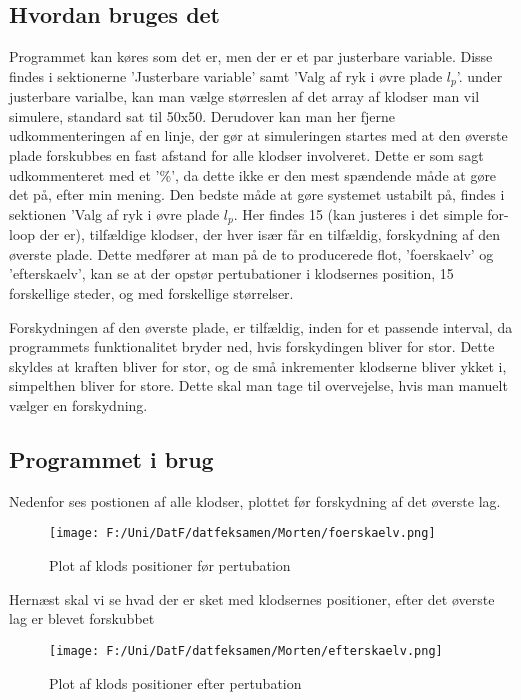 \documentclass[12pt]{article}
\begin{document}
\subsection{Hvordan bruges det}
Programmet kan køres som det er, men der er et par justerbare variable. Disse findes i sektionerne 'Justerbare variable' samt 'Valg af ryk i øvre plade $ l_{p} $'.
under justerbare varialbe, kan man vælge størreslen af det array af klodser man vil simulere, standard sat til 50x50. Derudover kan man her fjerne udkommenteringen af en linje, der gør at simuleringen startes med at den øverste plade forskubbes en fast afstand for alle klodser involveret. Dette er som sagt udkommenteret med et '\%', da dette ikke er den mest spændende måde at gøre det på, efter min mening. 
Den bedste måde at gøre systemet ustabilt på, findes i sektionen 'Valg af ryk i øvre plade $ l_p $. Her findes 15 (kan justeres i det simple for-loop der er), tilfældige klodser, der hver især får en tilfældig, forskydning af den øverste plade. Dette medfører at man på de to producerede flot, 'foerskaelv' og 'efterskaelv', kan se at der opstør pertubationer i klodsernes position, 15 forskellige steder, og med forskellige størrelser.

Forskydningen af den øverste plade, er tilfældig, inden for et passende interval, da programmets funktionalitet bryder ned, hvis forskydingen bliver for stor. Dette skyldes at kraften bliver for stor, og de små inkrementer klodserne bliver ykket i, simpelthen bliver for store. Dette skal man tage til overvejelse, hvis man manuelt vælger en forskydning.


\subsection{Programmet i brug}

Nedenfor ses postionen af alle klodser, plottet før forskydning af det øverste lag.
\begin{figure}[!h]
\centering
\texttt{[image: F:/Uni/DatF/datfeksamen/Morten/foerskaelv.png]}
\caption{Plot af klods positioner før pertubation}
\end{figure}

\newpage
Hernæst skal vi se hvad der er sket med klodsernes positioner, efter det øverste lag er blevet forskubbet

\begin{figure}[!h]
\centering
\texttt{[image: F:/Uni/DatF/datfeksamen/Morten/efterskaelv.png]}
\caption{Plot af klods positioner efter pertubation}
\end{figure}
\end{document}
